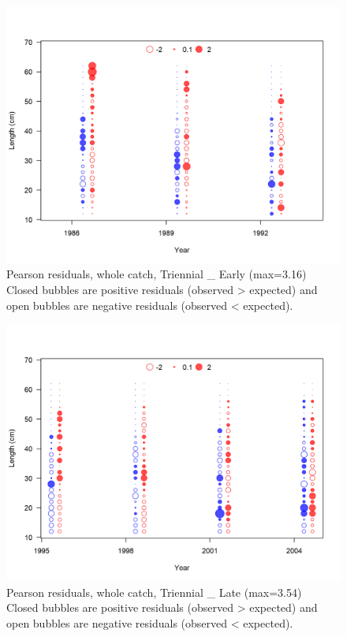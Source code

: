 \documentclass[12pt,]{article}
\begin{document}
\begin{figure}
\centering
\includegraphics{r4ss/plots_mod1/comp_lenfit_residsflt5mkt0.png}
\caption{Pearson residuals, whole catch, Triennial \_ Early (max=3.16)\\
Closed bubbles are positive residuals (observed \textgreater{} expected)
and open bubbles are negative residuals (observed \textless{} expected).
\label{fig:tri_early_len_pearson}}
\end{figure}

\begin{figure}
\centering
\includegraphics{r4ss/plots_mod1/comp_lenfit_residsflt6mkt0.png}
\caption{Pearson residuals, whole catch, Triennial \_ Late (max=3.54)\\
Closed bubbles are positive residuals (observed \textgreater{} expected)
and open bubbles are negative residuals (observed \textless{} expected).
\label{fig:tri_late_len_pearson}}
\end{figure}
\end{document}
